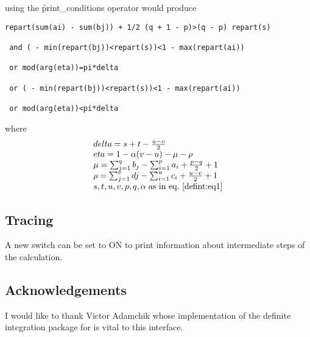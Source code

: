 using the \f{print\_conditions} operator would produce

\begin{verbatim}
repart(sum(ai) - sum(bj)) + 1/2 (q + 1 - p)>(q - p) repart(s)

 and ( - min(repart(bj))<repart(s))<1 - max(repart(ai))

 or mod(arg(eta))=pi*delta

 or ( - min(repart(bj))<repart(s))<1 - max(repart(ai))

 or mod(arg(eta))<pi*delta
\end{verbatim}

where
\[
\begin{array}{l}
delta = s+t-\frac{u-v}{2}\\
eta = 1-\alpha(v-u)-\mu-\rho\\
\mu = \sum_{j=1}^{q} b_{j} - \sum_{i=1}^{p} a_{i} + \frac{p-q}{2} + 1\\
\rho = \sum_{j=1}^{v} d{j} - \sum_{i=1}^{u} c_{i} + \frac{u-v}{2} + 1\\
s,t,u,v,p,q,\alpha \; \text{as in eq.~\ref{defint:eq1}}
\end{array}
\]


\subsection{Tracing}

A new switch  can be set to ON to print information about intermediate steps
of the calculation.

\subsection{Acknowledgements}
I would like to thank Victor Adamchik whose implementation of the
definite integration package for {\REDUCE} is vital to this
interface.
